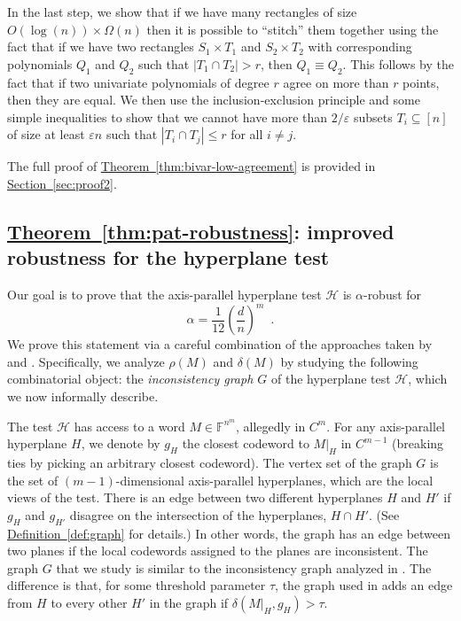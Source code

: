 \documentclass[11pt]{article}
\numberwithin{equation}{section}
\theoremstyle{definition}
\theoremstyle{plain}
\newcommand{\expref}[2]{\hyperref[#2]{#1~\ref{#2}}}
\theoremstyle{plain}
\newcommand{\colored}{}
\newcommand{\reldist}{\colored{\delta}}
\newcommand{\robust}{\colored{\rho}} %
\newcommand{\tester}{\colored{\mathcal H}} %
\newcommand{\plane}{{\colored{H}}} %
\newcommand{\otherplane}{\colored{ {H'}}} %
\newcommand{\codedist}{\colored{d}} %
\newcommand{\blocklength}{\colored{n}} %
\newcommand{\testerinput}{\colored{M}} %
\newcommand{\closestlocalword}[1]{ \colored{g_{#1}}} %
\newcommand{\Field}{\colored{\mathbb F}}
\newcommand{\degree}{\colored{r}}
\newcommand{\eps}{\varepsilon}
\newcommand\abs[1]{\colored{\left|#1\right|}}
\begin{document}
In the last step, we show that if we have many rectangles of size $O(\log(\blocklength)) \times \Omega(\blocklength)$ then it is possible to ``stitch'' them together using the fact that if we have two rectangles $S_1 \times T_1$ and $S_2 \times T_2$ with corresponding polynomials $Q_1$ and $Q_2$ such that $\abs{T_1 \cap T_2} > \degree$, then $Q_1 \equiv Q_2$. This follows by the fact that if two univariate polynomials of degree $\degree$ agree on more than $\degree$ points, then they are equal. We then use the inclusion-exclusion principle and some simple inequalities to show that we cannot have more than ${2}/{\eps}$ subsets $T_i \subseteq [n]$ of size at least $\eps\blocklength$ such that $\abs{T_i \cap T_j} \leq \degree$ for all $i \neq j$.

The full proof of \expref{Theorem}{thm:bivar-low-agreement} is provided in \expref{Section}{sec:proof2}.

%
%
\subsection{\expref{Theorem}{thm:pat-robustness}: improved robustness for the hyperplane test}
\label{sec:techniques-1}

Our goal is to prove that the axis-parallel hyperplane test $\tester$ is $\alpha$-robust for
\[
  \alpha = \frac{1}{12} \left(\frac{\codedist}{\blocklength}\right)^m\enspace.
\]
We prove this statement via a careful combination of the approaches
taken by \cite{Ben-SassonS06} and \cite{Viderman12}. Specifically, we
analyze $\robust(\testerinput)$ and $\reldist(\testerinput)$ by
studying the following combinatorial object: the \emph{inconsistency
  graph $G$} of the hyperplane test $\tester$, which we now informally
describe.

The test $\tester$ has access to a word $\testerinput \in \Field^{\blocklength^m}$, allegedly in $C^{m}$. For any axis-parallel hyperplane $\plane$, we denote by $\closestlocalword{\plane}$ the closest codeword to $\testerinput \vert_{\plane}$ in $C^{m-1}$ (breaking ties by picking an arbitrary closest codeword). The vertex set of the graph $G$ is the set of $(m-1)$-dimensional axis-parallel hyperplanes, which are the local views of the test. There is an edge between two different hyperplanes $\plane$ and $\otherplane$ if $\closestlocalword{\plane}$ and $\closestlocalword{\otherplane}$ disagree on the intersection of the hyperplanes, $\plane \cap \otherplane$. (See \expref{Definition}{def:graph} for details.) In other words, the graph has an edge between two planes if the local codewords assigned to the planes are inconsistent. The graph $G$ that we study is similar to the inconsistency graph analyzed in \cite{Ben-SassonS06}. The difference is that, for some threshold parameter $\tau$, the graph used in \cite{Ben-SassonS06} adds an edge from $\plane$ to every other $\otherplane$ in the graph if $\reldist(\testerinput \vert_{\plane},\closestlocalword{\plane}) > \tau$.
\end{document}
